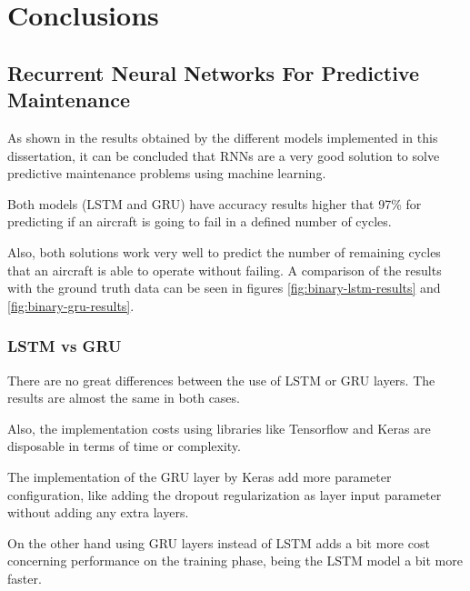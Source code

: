 
\chapter{Conclusions} %

\label{Chapter6} %


\section{Recurrent Neural Networks For Predictive Maintenance}

As shown in the results obtained by the different models implemented in this dissertation, it can be concluded that RNNs are a very good solution to solve predictive maintenance problems using machine learning.

Both models (LSTM and GRU) have accuracy results higher that 97\% for predicting if an aircraft is going to fail in a defined number of cycles.

Also, both solutions work very well to predict the number of remaining cycles that an aircraft is able to operate without failing. A comparison of the results with the ground truth data can be seen in figures \ref{fig:binary-lstm-results} and \ref{fig:binary-gru-results}.

\subsection{LSTM vs GRU}

There are no great differences between the use of LSTM or GRU layers.
The results are almost the same in both cases.

Also, the implementation costs using libraries like Tensorflow and Keras are disposable in terms of time or complexity.

The implementation of the GRU layer by Keras add more parameter configuration, like adding the dropout regularization as layer input parameter without adding any extra layers.

On the other hand using GRU layers instead of LSTM adds a bit more cost concerning performance on the training phase, being the LSTM model a bit more faster.

